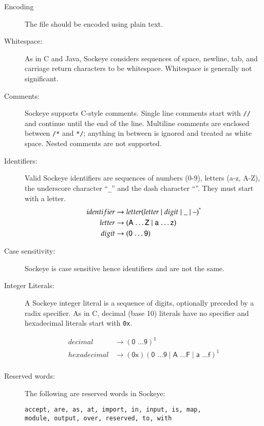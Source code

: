 \documentclass[a4paper,11pt,twoside]{report}
\begin{document}
{{{\begin{description}
\item[Encoding] The file should be encoded using plain text.
\item[Whitespace:]  As in C and Java, Sockeye considers sequences of
  space, newline, tab, and carriage return characters to be
  whitespace.  Whitespace is generally not significant. 

\item[Comments:] Sockeye supports C-style comments.  Single line comments
  start with \texttt{//} and continue until the end of the line.
  Multiline comments are enclosed between \texttt{/*} and \texttt{*/};
  anything in between is ignored and treated as white space.
  Nested comments are not supported.

\item[Identifiers:] Valid Sockeye identifiers are sequences of numbers
  (0-9), letters (a-z, A-Z), the underscore character ``\texttt{\_}'' and the dash character ``\textendash''. They
  must start with a letter.
  \begin{align*}
  identifier & \rightarrow letter (letter \mid digit \mid \text{\_} \mid \text{\textendash})^{\textrm{*}} \\
  letter & \rightarrow (\textsf{A \ldots Z} \mid  \textsf{a \ldots z})\\
  digit & \rightarrow (\textsf{0 \ldots 9})
    \end{align*}

\item[Case sensitivity:] Sockeye is case sensitive hence identifiers  and  are not the same.
  
\item[Integer Literals:] A Sockeye integer literal is a sequence of
  digits, optionally preceded by a radix specifier.  As in C, decimal (base 10)
  literals have no specifier and hexadecimal literals start with
  \texttt{0x}.

\begin{align*}
decimal & \rightarrow (\textsf{0 \ldots 9})^{\textrm{1}}\\
hexadecimal & \rightarrow (\textsf{0x})(\textsf{0 \ldots 9} \mid \textsf{A \ldots F} \mid \textsf{a \ldots f})^{\textrm{1}}\\
\end{align*}

\item[Reserved words:] The following are reserved words in Sockeye:
\begin{verbatim}
accept, are, as, at, import, in, input, is, map,
module, output, over, reserved, to, with
\end{verbatim}


\end{description}}}}
\end{document}
